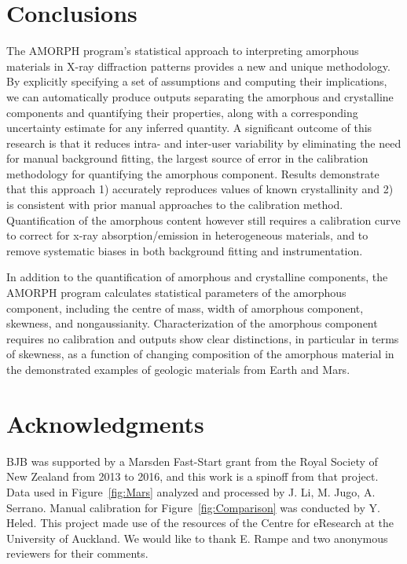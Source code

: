 \documentclass[review]{elsarticle}
\newcommand{\changed}{\color{blue}}
\begin{document}
\section{Conclusions}\label{sec:conclusions}
The AMORPH program’s statistical approach to interpreting amorphous materials in X-ray
diffraction patterns provides a new and unique methodology.
By explicitly specifying a set of assumptions and computing their
implications, we can automatically produce outputs separating the
amorphous and crystalline components and quantifying their properties,
along with a corresponding uncertainty estimate for any inferred
quantity.
A significant outcome of this research is that it reduces intra- and inter-user variability
by eliminating the need for manual background fitting, the largest source of error in the
calibration methodology for quantifying the amorphous component. Results demonstrate that
this approach 1) accurately reproduces values of known crystallinity and 2) is consistent
with prior manual approaches to the calibration method. Quantification of the amorphous
content however still requires a calibration curve to correct for x-ray absorption/emission
in heterogeneous materials, and to remove systematic biases in both background fitting and instrumentation. 

In addition to the quantification of amorphous and crystalline components, the AMORPH
program calculates statistical parameters of the amorphous component, including the centre
of mass, width of amorphous component, skewness, and nongaussianity. Characterization of the amorphous component requires no calibration and outputs show 
clear distinctions, in particular in terms of skewness, as a function of changing composition of the amorphous material in the demonstrated examples of
geologic materials from Earth and Mars.


\section*{Acknowledgments}

BJB was supported by a Marsden Fast-Start grant from the Royal Society of
New Zealand from 2013 to 2016, and this work is a spinoff from that
project. Data used in Figure~\ref{fig:Mars} analyzed and processed by J. Li, M. Jugo, A. Serrano. Manual calibration for Figure~\ref{fig:Comparison} was conducted by Y. Heled. This project made use of the resources of the Centre for
eResearch at the University of Auckland. {\changed We would like to thank E. Rampe and two anonymous reviewers for their comments.}
\end{document}
